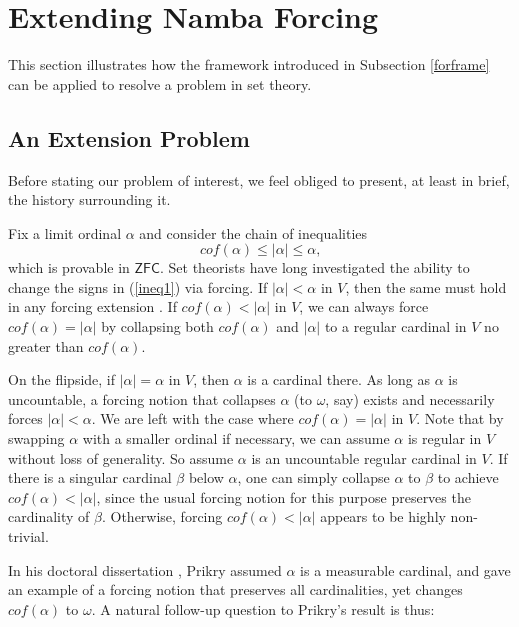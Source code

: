 \documentclass[12pt]{article}
\numberwithin{equation}{section}
\begin{document}
\section{Extending Namba Forcing}\label{sect2}

This section illustrates how the framework introduced in Subsection \ref{forframe} can be applied to resolve a problem in set theory.

\subsection{An Extension Problem}

Before stating our problem of interest, we feel obliged to present, at least in brief, the history surrounding it. 

Fix a limit ordinal $\alpha$ and consider the chain of inequalities
\begin{equation}\label{ineq1}
    cof(\alpha) \leq |\alpha| \leq \alpha \text{,}
\end{equation} 
which is provable in $\mathsf{ZFC}$. Set theorists have long investigated the ability to change the signs in (\ref{ineq1}) via forcing. If $|\alpha| < \alpha$ in $V$, then the same must hold in any forcing extension . If $cof(\alpha) < |\alpha|$ in $V$, we can always force $cof(\alpha) = |\alpha|$ by collapsing both $cof(\alpha)$ and $|\alpha|$ to a regular cardinal in $V$ no greater than $cof(\alpha)$.

On the flipside, if $|\alpha| = \alpha$ in $V$, then $\alpha$ is a cardinal there. As long as $\alpha$ is uncountable, a forcing notion that collapses $\alpha$ (to $\omega$, say) exists and necessarily forces $|\alpha| < \alpha$. We are left with the case where $cof(\alpha) = |\alpha|$ in $V$. Note that by swapping $\alpha$ with a smaller ordinal if necessary, we can assume $\alpha$ is regular in $V$ without loss of generality. So assume $\alpha$ is an uncountable regular cardinal in $V$. If there is a singular cardinal $\beta$ below $\alpha$, one can simply collapse $\alpha$ to $\beta$ to achieve $cof(\alpha) < |\alpha|$, since the usual forcing notion for this purpose preserves the cardinality of $\beta$. Otherwise, forcing $cof(\alpha) < |\alpha|$ appears to be highly non-trivial.

In his doctoral dissertation \cite{prikry}, Prikry assumed $\alpha$ is a measurable cardinal, and gave an example of a forcing notion that preserves all cardinalities, yet changes $cof(\alpha)$ to $\omega$. A natural follow-up question to Prikry's result is thus:
\end{document}
